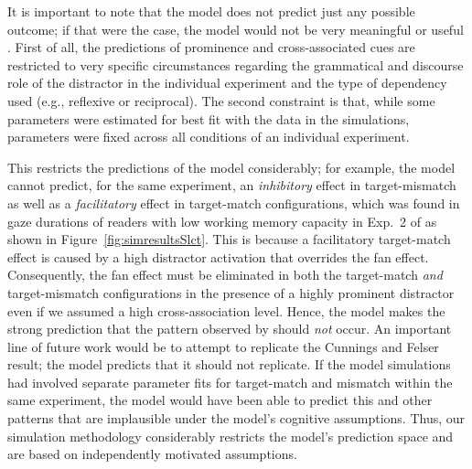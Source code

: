 \documentclass{cambridge7A}\usepackage[]{graphicx}\usepackage[]{color}
\newcommand{\revFE}[1]{#1}
\begin{document}
\revFE{
It is important to note that the model does not predict just any possible outcome; if that were the case, the model would not be very meaningful or useful \citep{rp}.
First of all, the predictions of prominence and cross-associated cues are restricted to very specific circumstances regarding the grammatical and discourse role of the distractor in the individual experiment and the type of dependency used (e.g., reflexive or reciprocal).
The second constraint is that, while some parameters were estimated for best fit with the data in the simulations, parameters were fixed across all conditions of an individual experiment.
}
This restricts the predictions of the model considerably; for example, the model cannot predict, for the same experiment, an  \emph{inhibitory} effect in target-mismatch as well as a  \emph{facilitatory} effect in target-match configurations, which was found in gaze durations of readers with low working memory capacity in Exp.~2 of \cite{CunningsFelser2013} as shown in Figure~\ref{fig:simresultsSlct}. 
This is because a facilitatory target-match effect is caused by a high  distractor activation that overrides the  fan effect. Consequently, the fan effect must be eliminated in both the target-match \textit{and} target-mismatch configurations in the presence of a highly prominent distractor even if we assumed a high cross-association level.
Hence, the model makes the strong prediction that the pattern observed by \cite{CunningsFelser2013} should \emph{not} occur. An important line of future work would be to attempt to replicate the Cunnings and Felser result; the model predicts that it should not replicate. If the model simulations had involved separate parameter fits for target-match and mismatch within the same experiment, the model would have been able to predict this and other patterns that are implausible under the model's cognitive assumptions.
\revFE{Thus, our simulation methodology  considerably restricts the model's prediction space and are based on independently motivated assumptions.}
\end{document}
